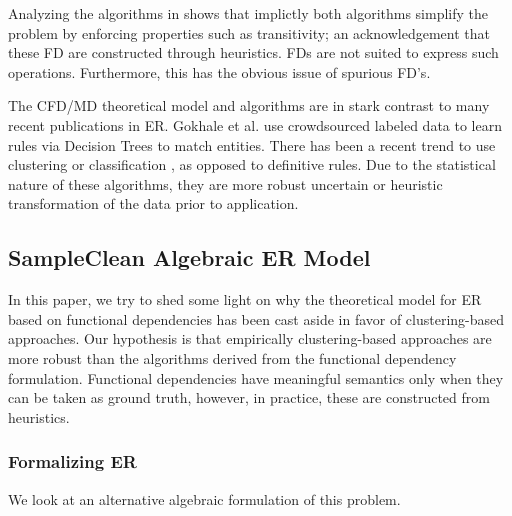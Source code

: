 Analyzing the algorithms in \cite{bertossi2013data, fan2011dynamic} shows that implictly both algorithms simplify the problem by enforcing properties such as transitivity; an acknowledgement that these FD are constructed through heuristics.
FDs are not suited to express such operations.
Furthermore, this has the obvious issue of spurious FD's.

The CFD/MD theoretical model and algorithms are in stark contrast to many recent publications in ER.
Gokhale et al. \cite{gokhale2014corleone} use crowdsourced labeled data to learn rules via Decision Trees to match entities.
There has been a recent trend to use clustering or classification \cite{getoor2012entity, bhattacharya2007collective}, as opposed to definitive rules.
Due to the statistical nature of these algorithms, they are more robust uncertain or heuristic transformation of the data prior to application.

\subsection{SampleClean Algebraic ER Model}
In this paper, we try to shed some light on why the theoretical model for ER based on functional dependencies has been cast aside in favor of clustering-based approaches.
Our hypothesis is that empirically clustering-based approaches are more robust than the algorithms derived from the functional dependency formulation.
Functional dependencies have meaningful semantics only when they can be taken as ground truth, however, in practice, these are constructed from heuristics.

\subsubsection{Formalizing ER}
We look at an alternative algebraic formulation of this problem.


